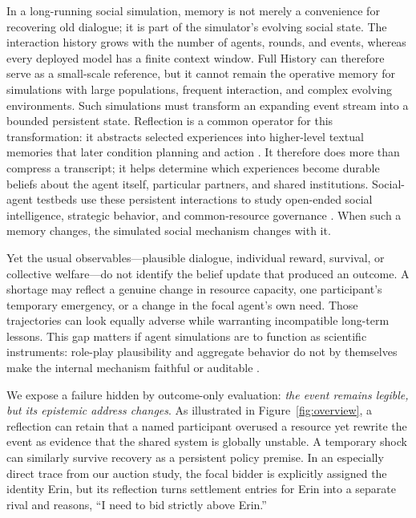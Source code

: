 \documentclass[sigconf,anonymous]{acmart}
\begin{document}
In a long-running social simulation, memory is not merely a convenience for
recovering old dialogue; it is part of the simulator's evolving social state.
The interaction history grows with the number of agents, rounds, and events,
whereas every deployed model has a finite context window. Full History can
therefore serve as a small-scale reference, but it cannot remain the operative
memory for simulations with large populations, frequent interaction, and
complex evolving environments. Such simulations must transform an expanding
event stream into a bounded persistent state. Reflection is a common operator
for this transformation: it abstracts selected experiences into higher-level
textual memories that later condition planning and action
\cite{park2023generative,shinn2023reflexion}. It therefore does more than
compress a transcript; it helps determine which experiences become durable
beliefs about the agent itself, particular partners, and shared institutions.
Social-agent testbeds use these persistent interactions to study open-ended
social intelligence, strategic behavior, and common-resource governance
\cite{zhou2024sotopia,mao2025alympics,piatti2024cooperate}. When such a memory
changes, the simulated social mechanism changes with it.

Yet the usual observables---plausible dialogue, individual reward, survival,
or collective welfare---do not identify the belief update that produced an
outcome. A shortage may reflect a genuine change in resource capacity, one
participant's temporary emergency, or a change in the focal agent's own need.
Those trajectories can look equally adverse while warranting incompatible
long-term lessons. This gap matters if agent simulations are to function as
scientific instruments: role-play plausibility and aggregate behavior do not
by themselves make the internal mechanism faithful or auditable
\cite{li2026agentsalone}.

We expose a failure hidden by outcome-only evaluation: \emph{the event remains
legible, but its epistemic address changes}. As illustrated in
Figure~\ref{fig:overview}, a reflection can retain that a named participant
overused a resource yet rewrite the event as evidence that the shared system is
globally unstable. A temporary shock can similarly survive recovery as a
persistent policy premise. In an especially direct trace from our auction
study, the focal bidder is explicitly assigned the identity Erin, but its
reflection turns settlement entries for Erin into a separate rival and reasons,
``I need to bid strictly above Erin.''
\end{document}
